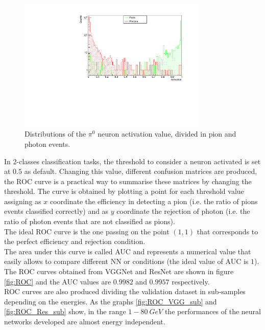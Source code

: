 \begin{figure}
	\centering
	\includegraphics[width=0.8\textwidth]{IMG/Cap6/Res_hist_pi.pdf}
	\caption{Distributions of the $\pi^0$ neuron activation value, divided in pion and photon events.}
	\label{fig:VGG_hist_pi}
\end{figure}

In 2-classes classification tasks, the threshold to consider a neuron activated is set at $0.5$ as default. Changing this value, different confusion matrices are produced, the ROC curve is a practical way to summarise these matrices by changing the threshold. The curve is obtained by plotting a point for each threshold value assigning as $x$ coordinate the efficiency in detecting a pion (i.e. the ratio of pions events classified correctly) and as $y$ coordinate the rejection of photon (i.e. the ratio of photon events that are not classified as pions).\\
The ideal ROC curve is the one passing on the point $(1,1)$ that corresponds to the perfect efficiency and rejection condition.\\
The area under this curve is called AUC and represents a numerical value that easily allows to compare different NN or conditions (the ideal value of AUC is $1$).\\

The ROC curves obtained from VGGNet and ResNet are shown in figure \ref{fig:ROC} and the AUC values are $0.9982$ and $0.9957$ respectively.\\

ROC curves are also produced dividing the validation dataset in sub-samples depending on the energies.
As the graphs \ref{fig:ROC_VGG_sub} and \ref{fig:ROC_Res_sub} show, in the range $1-80\ GeV$ the performances of the neural networks developed are almost energy independent.

